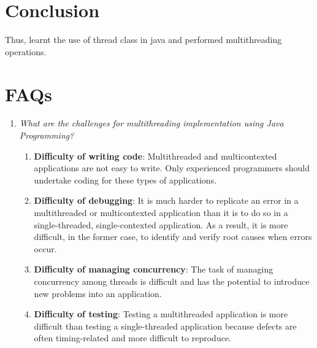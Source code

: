 \documentclass[11pt]{article}
\begin{document}
\section{Conclusion}
Thus, learnt the use of thread class in java and performed multithreading operations.

\pagebreak

\section{FAQs}

\begin{enumerate}
	\item \textit{What are the challenges for multithreading implementation using Java Programming?}\\
	      \begin{enumerate}
		      \item \textbf{Difficulty of writing code}: Multithreaded and multicontexted applications are not easy to write. Only experienced programmers should undertake coding for these types of applications.

		      \item \textbf{Difficulty of debugging}: It is much harder to replicate an error in a multithreaded or multicontexted application than it is to do so in a single-threaded, single-contexted application. As a result, it is more difficult, in the former case, to identify and verify root causes when errors occur.


		      \item \textbf{Difficulty of managing concurrency}: The task of managing concurrency among threads is difficult and has the potential to introduce new problems into an application.


		      \item \textbf{Difficulty of testing}: Testing a multithreaded application is more difficult than testing a single-threaded application because defects are often timing-related and more difficult to reproduce.



\end{enumerate}
\end{enumerate}
\end{document}
